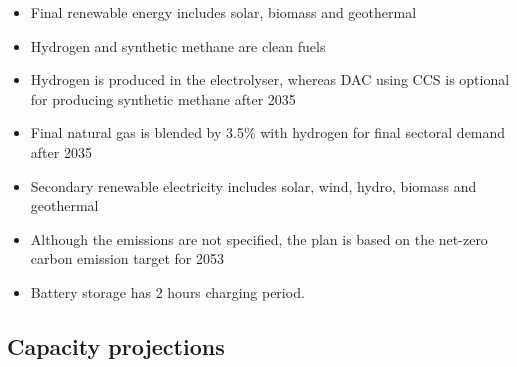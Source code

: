 \documentclass[11pt]{article}
\providecommand{\tightlist}{%
      \setlength{\itemsep}{0pt}\setlength{\parskip}{0pt}}
\begin{document}
\begin{itemize}
\tightlist
\item
  Final renewable energy includes solar, biomass and geothermal
\item
  Hydrogen and synthetic methane are clean fuels
\item
  Hydrogen is produced in the electrolyser, whereas DAC using CCS is
  optional for producing synthetic methane after 2035
\item
  Final natural gas is blended by 3.5\% with hydrogen for final sectoral
  demand after 2035
\item
  Secondary renewable electricity includes solar, wind, hydro, biomass
  and geothermal
\item
  Although the emissions are not specified, the plan is based on the
  net-zero carbon emission target for 2053
\item
  Battery storage has 2 hours charging period.
\end{itemize}

    \hypertarget{capacity-projections}{%
\subsection{Capacity projections}\label{capacity-projections}}
\end{document}
